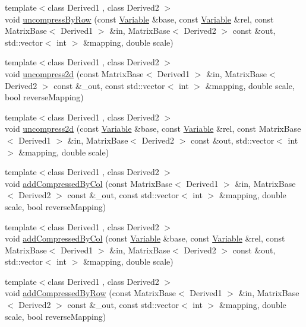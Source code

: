 \begin{DoxyCompactItemize}
\item 
{\footnotesize template$<$class Derived1 , class Derived2 $>$ }\\void \hyperlink{namespaceocra_1_1utils_aa1f9829f8b85e3b006b691a924b12e3f}{uncompress\+By\+Row} (const \hyperlink{classocra_1_1Variable}{Variable} \&base, const \hyperlink{classocra_1_1Variable}{Variable} \&rel, const Matrix\+Base$<$ Derived1 $>$ \&in, Matrix\+Base$<$ Derived2 $>$ const \&out, std\+::vector$<$ int $>$ \&mapping, double scale)
\item 
{\footnotesize template$<$class Derived1 , class Derived2 $>$ }\\void \hyperlink{namespaceocra_1_1utils_a6336653c4ed344718fdf1c888c668a58}{uncompress2d} (const Matrix\+Base$<$ Derived1 $>$ \&in, Matrix\+Base$<$ Derived2 $>$ const \&\+\_\+out, const std\+::vector$<$ int $>$ \&mapping, double scale, bool reverse\+Mapping)
\item 
{\footnotesize template$<$class Derived1 , class Derived2 $>$ }\\void \hyperlink{namespaceocra_1_1utils_a5189699a011acaa6413bd14c178254c3}{uncompress2d} (const \hyperlink{classocra_1_1Variable}{Variable} \&base, const \hyperlink{classocra_1_1Variable}{Variable} \&rel, const Matrix\+Base$<$ Derived1 $>$ \&in, Matrix\+Base$<$ Derived2 $>$ const \&out, std\+::vector$<$ int $>$ \&mapping, double scale)
\item 
{\footnotesize template$<$class Derived1 , class Derived2 $>$ }\\void \hyperlink{namespaceocra_1_1utils_a4a6965e28f8a5284f406ca2cea54a221}{add\+Compressed\+By\+Col} (const Matrix\+Base$<$ Derived1 $>$ \&in, Matrix\+Base$<$ Derived2 $>$ const \&\+\_\+out, const std\+::vector$<$ int $>$ \&mapping, double scale, bool reverse\+Mapping)
\item 
{\footnotesize template$<$class Derived1 , class Derived2 $>$ }\\void \hyperlink{namespaceocra_1_1utils_a8b6a78df5f205a61d8b4d29a2a82c864}{add\+Compressed\+By\+Col} (const \hyperlink{classocra_1_1Variable}{Variable} \&base, const \hyperlink{classocra_1_1Variable}{Variable} \&rel, const Matrix\+Base$<$ Derived1 $>$ \&in, Matrix\+Base$<$ Derived2 $>$ const \&out, std\+::vector$<$ int $>$ \&mapping, double scale)
\item 
{\footnotesize template$<$class Derived1 , class Derived2 $>$ }\\void \hyperlink{namespaceocra_1_1utils_a8256ba2ed6ce4d6066c03631e64e27f9}{add\+Compressed\+By\+Row} (const Matrix\+Base$<$ Derived1 $>$ \&in, Matrix\+Base$<$ Derived2 $>$ const \&\+\_\+out, const std\+::vector$<$ int $>$ \&mapping, double scale, bool reverse\+Mapping)

\end{DoxyCompactItemize}

